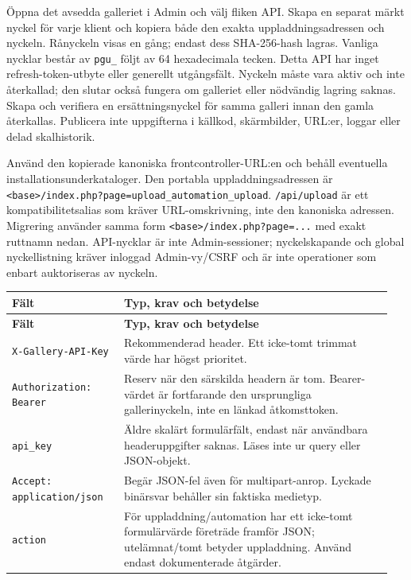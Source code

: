 \documentclass[11pt,a4paper]{article}
\newcommand{\codeword}[1]{\nolinkurl{#1}}
\begin{document}
Öppna det avsedda galleriet i Admin och välj fliken API. Skapa en separat märkt nyckel för
varje klient och kopiera både den exakta uppladdningsadressen och nyckeln. Rånyckeln visas
en gång; endast dess SHA-256-hash lagras. Vanliga nycklar består av \codeword{pgu_} följt av
64 hexadecimala tecken. Detta API har inget refresh-token-utbyte eller generellt
utgångsfält. Nyckeln måste vara aktiv och inte återkallad; den slutar också fungera om
galleriet eller nödvändig lagring saknas. Skapa och verifiera en ersättningsnyckel för samma
galleri innan den gamla återkallas. Publicera inte uppgifterna i källkod, skärmbilder,
URL:er, loggar eller delad skalhistorik.

Använd den kopierade kanoniska frontcontroller-URL:en och behåll eventuella
installationsunderkataloger. Den portabla uppladdningsadressen är
\codeword{<base>/index.php?page=upload_automation_upload}. \codeword{/api/upload} är ett
kompatibilitetsalias som kräver URL-omskrivning, inte den kanoniska adressen. Migrering
använder samma form \codeword{<base>/index.php?page=...} med exakt ruttnamn nedan.
API-nycklar är inte Admin-sessioner; nyckelskapande och global nyckellistning kräver
inloggad Admin-vy/CSRF och är inte operationer som enbart auktoriseras av nyckeln.

\begin{longtable}{@{}>{\RaggedRight\arraybackslash}p{0.28\linewidth}>{\RaggedRight\arraybackslash}p{0.67\linewidth}@{}}
\toprule
\textbf{Fält} & \textbf{Typ, krav och betydelse} \\
\midrule
\endfirsthead
\toprule
\textbf{Fält} & \textbf{Typ, krav och betydelse} \\
\midrule
\endhead
\bottomrule
\endfoot
\codeword{X-Gallery-API-Key} & Rekommenderad header. Ett icke-tomt trimmat värde har högst
prioritet. \\
\codeword{Authorization: Bearer} & Reserv när den särskilda headern är tom. Bearer-värdet är
fortfarande den ursprungliga gallerinyckeln, inte en länkad åtkomsttoken. \\
\codeword{api_key} & Äldre skalärt formulärfält, endast när användbara headeruppgifter
saknas. Läses inte ur query eller JSON-objekt. \\
\codeword{Accept: application/json} & Begär JSON-fel även för multipart-anrop. Lyckade
binärsvar behåller sin faktiska medietyp. \\
\codeword{action} & För uppladdning/automation har ett icke-tomt formulärvärde företräde
framför JSON; utelämnat/tomt betyder uppladdning. Använd endast dokumenterade åtgärder. \\
\end{longtable}
\end{document}
